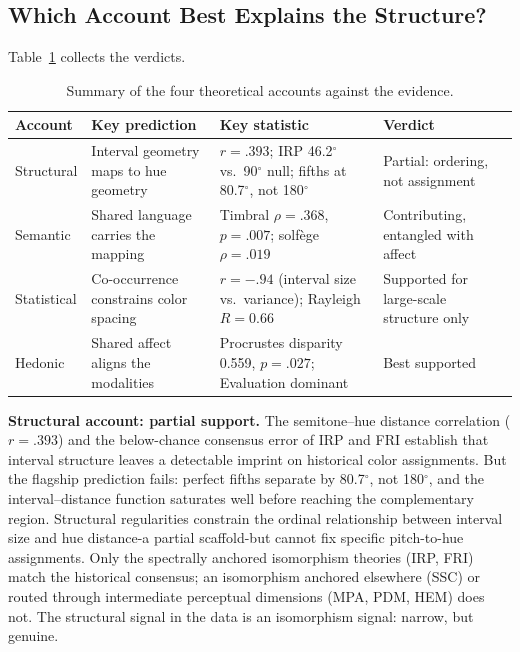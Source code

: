 \documentclass[12pt]{article}
\begin{document}
\subsection{Which Account Best Explains the Structure?}

Table~\ref{tab:account_summary} collects the verdicts.

\begin{table}[htbp]
\centering
\caption{Summary of the four theoretical accounts against the
evidence.}
\label{tab:account_summary}
\begin{tabular}{@{}p{2.4cm}p{4.4cm}p{3.6cm}p{3.4cm}@{}}
\toprule
\textbf{Account} & \textbf{Key prediction} & \textbf{Key statistic} &
  \textbf{Verdict} \\
\midrule
Structural & Interval geometry maps to hue geometry
  & $r = .393$; IRP 46.2$^\circ$ vs.\ 90$^\circ$ null; fifths at
    80.7$^\circ$, not 180$^\circ$
  & Partial: ordering, not assignment \\
Semantic & Shared language carries the mapping
  & Timbral $\rho = .368$, $p = .007$; solf\`{e}ge $\rho = .019$
  & Contributing, entangled with affect \\
Statistical & Co-occurrence constrains color spacing
  & $r = -.94$ (interval size vs.\ variance); Rayleigh $R = 0.66$
  & Supported for large-scale structure only \\
Hedonic & Shared affect aligns the modalities
  & Procrustes disparity 0.559, $p = .027$; Evaluation dominant
  & Best supported \\
\bottomrule
\end{tabular}
\end{table}

\textbf{Structural account: partial support.} The semitone--hue
distance correlation ($r = .393$) and the below-chance consensus error
of IRP and FRI establish that interval structure leaves a detectable
imprint on historical color assignments. But the flagship prediction
fails: perfect fifths separate by 80.7$^\circ$, not 180$^\circ$, and
the interval--distance function saturates well before reaching the
complementary region. Structural regularities constrain the ordinal
relationship between interval size and hue distance-a partial
scaffold-but cannot fix specific pitch-to-hue assignments. Only the
spectrally anchored isomorphism theories (IRP, FRI) match the
historical consensus; an isomorphism anchored elsewhere (SSC) or
routed through intermediate perceptual dimensions (MPA, PDM, HEM)
does not. The
structural signal in the data is an isomorphism signal: narrow, but
genuine.
\end{document}
